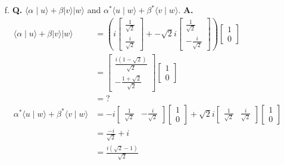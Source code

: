 \documentclass[main.tex]{subfiles}
\begin{document}
\begin{enumerate}
\begin{enumerate}
        \item[f.] \textbf{Q.} $\langle \alpha \mid u\rangle+\beta|v\rangle|w\rangle$ and $\alpha^{*} \langle u \mid w\rangle+\beta^{*}\langle v \mid w\rangle$. \textbf{A.}
        \begin{align*}
            \langle \alpha \mid u\rangle+\beta|v\rangle|w\rangle                & = \left( i \left[\begin{array}{r} \frac{1}{\sqrt{2}} \\ \frac{i}{\sqrt{2}} \end{array}\right] 
                                                                                    + -\sqrt{2}i \left[\begin{array}{l}\frac{1}{\sqrt{2}}\\-\frac{i}{\sqrt{2}}\end{array}\right] \right) \left[\begin{array}{r} 1 \\ 0 \end{array}\right]\\
                                                                                & = \left[\begin{array}{r} \frac{i(1-\sqrt{2})}{\sqrt{2}} \\ -\frac{1+\sqrt{2}}{\sqrt{2}} \end{array}\right] \left[\begin{array}{r} 1 \\ 0 \end{array}\right] \\
                                                                                & = ? \\
            \alpha^{*} \langle u \mid w\rangle+\beta^{*}\langle v \mid w\rangle & = -i \left[\begin{array}{ll} \frac{1}{\sqrt{2}} & -\frac{i}{\sqrt{2}} \end{array}\right] \left[\begin{array}{r} 1 \\ 0 \end{array}\right]
                                                                                    + \sqrt{2}i \left[\begin{array}{ll} \frac{1}{\sqrt{2}} & \frac{i}{\sqrt{2}} \end{array}\right] \left[\begin{array}{r} 1 \\ 0 \end{array}\right]  \\
                                                                                & = \frac{-i}{\sqrt{2}} + i\\
                                                                                & = \frac{i(\sqrt{2}-1)}{\sqrt{2}}
        \end{align*}
        

\end{enumerate}
\end{enumerate}
\end{document}
